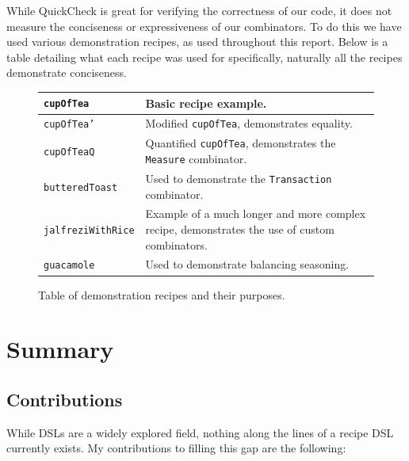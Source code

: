 \documentclass[11pt]{article}
\begin{document}
While QuickCheck is great for verifying the correctness of our code, it does
not measure the conciseness or expressiveness of our combinators. To do this
we have used various demonstration recipes, as used throughout this report. Below
is a table detailing what each recipe was used for specifically, naturally all
the recipes demonstrate conciseness.

\begin{figure}[h]
\begin{tabular}{ |p{35mm}|p{\textwidth - 40mm}| }
    \hline
    \texttt{cupOfTea} & Basic recipe example. \\
    \hline
    \texttt{cupOfTea'} & Modified \texttt{cupOfTea}, demonstrates equality. \\
    \hline
    \texttt{cupOfTeaQ} & Quantified \texttt{cupOfTea}, demonstrates the \texttt{Measure} combinator. \\
    \hline
    \texttt{butteredToast} & Used to demonstrate the \texttt{Transaction} combinator. \\
    \hline
    \texttt{jalfreziWithRice} & Example of a much longer and more complex recipe, demonstrates
        the use of custom combinators. \\
    \hline
    \texttt{guacamole} & Used to demonstrate balancing seasoning. \\
    \hline
\end{tabular}
\caption{Table of demonstration recipes and their purposes.}
\end{figure}

\section{Summary}

\subsection{Contributions}

While DSLs are a widely explored field, nothing along the lines of a recipe DSL
currently exists. My contributions to filling this gap are the following:
\end{document}
